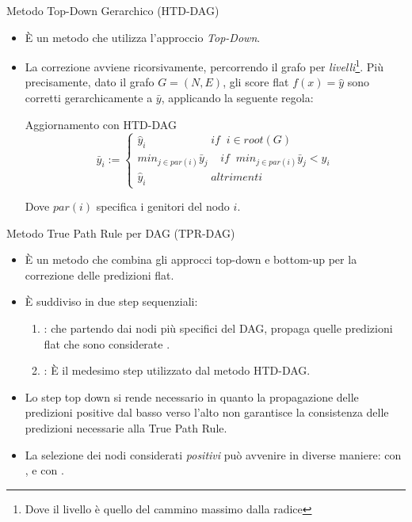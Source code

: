 \documentclass[9pt]{beamer}
\begin{document}
\begin{tframe}{Metodo Top-Down Gerarchico (HTD-DAG)}
\begin{itemize}

\item È un metodo che utilizza l'approccio \emph{Top-Down}.
\item La correzione avviene ricorsivamente, percorrendo il grafo per \emph{livelli}\footnote{\footnotesize{Dove il livello è quello del cammino massimo dalla radice}}. Più precisamente, dato il grafo $G = (N, E)$, gli score flat $f(x) = \hat{y}$ sono corretti gerarchicamente a $\bar{y}$, applicando la seguente regola:
\begin{block}{Aggiornamento con HTD-DAG}
\[
\bar{y}_i := 
\begin{cases}
\hat{y}_i \;\;\;\;\;\;\;\;\;\;\;\;\;\;\;\;\;\;\;\;\; if\;\; i \in root(G)\\
min_{j \in par(i)} \bar{y}_j \;\;\;\; if \;\; min_{j \in par(i)}\bar{y}_j < \hat{y}_i\\
\hat{y}_i \;\;\;\;\;\;\;\;\;\;\;\;\;\;\;\;\;\;\;\;\; altrimenti
\end{cases}
\]
\end{block}
Dove $par(i)$ specifica i genitori del nodo $i$.
\end{itemize} 
\end{tframe}

\begin{tframe}{Metodo True Path Rule per DAG (TPR-DAG)}
\begin{itemize}
\item È un metodo che combina gli approcci top-down e bottom-up per la correzione delle predizioni flat. 
\item È suddiviso in due step sequenziali:
\begin{enumerate}
\item {}: che partendo dai nodi più specifici del DAG, propaga quelle predizioni flat che sono considerate .
\item {}: È il medesimo step utilizzato dal metodo HTD-DAG.
\end{enumerate}
\item Lo step top down si rende necessario in quanto la propagazione delle predizioni positive dal basso verso l’alto non garantisce la consistenza delle predizioni necessarie alla True Path Rule. 
\item La selezione dei nodi considerati \emph{positivi} può avvenire in diverse maniere: con ,  e con .
\end{itemize}
\end{tframe}
\end{document}
